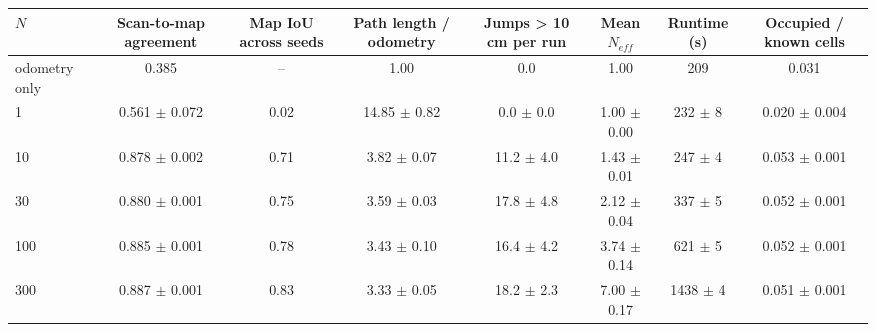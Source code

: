\begin{tabular}{lccccccc}
\toprule
$N$ & Scan-to-map agreement & Map IoU across seeds & Path length / odometry & Jumps > 10 cm per run & Mean $N_{eff}$ & Runtime (s) & Occupied / known cells \\
\midrule
odometry only & 0.385 & -- & 1.00 & 0.0 & 1.00 & 209 & 0.031 \\
1 & 0.561 $\pm$ 0.072 & 0.02 & 14.85 $\pm$ 0.82 & 0.0 $\pm$ 0.0 & 1.00 $\pm$ 0.00 & 232 $\pm$ 8 & 0.020 $\pm$ 0.004 \\
10 & 0.878 $\pm$ 0.002 & 0.71 & 3.82 $\pm$ 0.07 & 11.2 $\pm$ 4.0 & 1.43 $\pm$ 0.01 & 247 $\pm$ 4 & 0.053 $\pm$ 0.001 \\
30 & 0.880 $\pm$ 0.001 & 0.75 & 3.59 $\pm$ 0.03 & 17.8 $\pm$ 4.8 & 2.12 $\pm$ 0.04 & 337 $\pm$ 5 & 0.052 $\pm$ 0.001 \\
100 & 0.885 $\pm$ 0.001 & 0.78 & 3.43 $\pm$ 0.10 & 16.4 $\pm$ 4.2 & 3.74 $\pm$ 0.14 & 621 $\pm$ 5 & 0.052 $\pm$ 0.001 \\
300 & 0.887 $\pm$ 0.001 & 0.83 & 3.33 $\pm$ 0.05 & 18.2 $\pm$ 2.3 & 7.00 $\pm$ 0.17 & 1438 $\pm$ 4 & 0.051 $\pm$ 0.001 \\
\bottomrule
\end{tabular}
